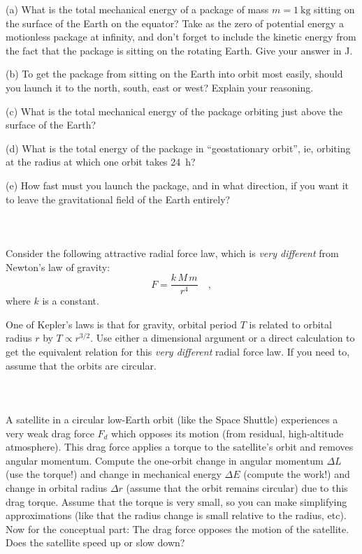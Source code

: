 \documentclass[12pt]{article}
\newcounter{problem}
\begin{document}
(a) What is the total mechanical energy of a package of mass $m=
1~\mathrm{kg}$ sitting on the surface of the Earth on the equator?
Take as the zero of potential energy a motionless package at infinity,
and don't forget to include the kinetic energy from the fact that the
package is sitting on the rotating Earth.  Give your answer in J.

(b) To get the package from sitting on the Earth into orbit most
easily, should you launch it to the north, south, east or west?
Explain your reasoning.

(c) What is the total mechanical energy of the package orbiting just
above the surface of the Earth? 

(d) What is the total energy of the package in ``geostationary
orbit'', ie, orbiting at the radius at which one orbit takes 24~h?

(e) How fast must you launch the package, and in what direction, if
you want it to leave the gravitational field of the Earth entirely?

\paragraph{\problemname~\theproblem}

Consider the following attractive radial force law, which is
\emph{very different} from Newton's law of gravity:
\begin{equation}
F = \frac{k\,M\,m}{r^4} \quad ,
\end{equation}
where $k$ is a constant.

One of Kepler's laws is that for gravity, orbital period $T$ is
related to orbital radius $r$ by $T\propto r^{3/2}$.  Use either a
dimensional argument or a direct calculation to get the equivalent
relation for this \emph{very different} radial force law.  If you need
to, assume that the orbits are circular.

\paragraph{\problemname~\theproblem}

A satellite in a circular low-Earth orbit (like the Space Shuttle)
experiences a very weak drag force $F_d$ which opposes its motion
(from residual, high-altitude atmosphere).  This drag force applies a
torque to the satellite's orbit and removes angular momentum.  Compute
the one-orbit change in angular momentum $\Delta L$ (use the torque!)
and change in mechanical energy $\Delta E$ (compute the work!) and
change in orbital radius $\Delta r$ (assume that the orbit remains
circular) due to this drag torque.  Assume that the torque is very
small, so you can make simplifying approximations (like that the
radius change is small relative to the radius, etc).  Now for the
conceptual part: The drag force opposes the motion of the satellite.
Does the satellite speed up or slow down?
\end{document}
